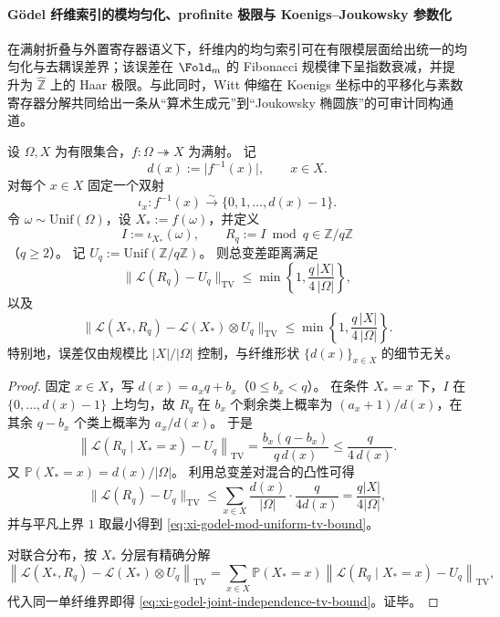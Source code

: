 \paragraph{Gödel 纤维索引的模均匀化、profinite 极限与 Koenigs--Joukowsky 参数化}
在满射折叠与外置寄存器语义下，纤维内的均匀索引可在有限模层面给出统一的均匀化与去耦误差界；该误差在 \(\Fold_m\) 的 Fibonacci 规模律下呈指数衰减，并提升为 \(\widehat{\mathbb Z}\) 上的 Haar 极限。与此同时，Witt 伸缩在 Koenigs 坐标中的平移化与素数寄存器分解共同给出一条从“算术生成元”到“Joukowsky 椭圆族”的可审计同构通道。

\begin{theorem}\label{thm:xi-godel-fiber-index-mod-uniformity-independence}
设 \(\Omega,X\) 为有限集合，\(f:\Omega\twoheadrightarrow X\) 为满射。
记
\[
d(x):=\bigl|f^{-1}(x)\bigr|,\qquad x\in X.
\]
对每个 \(x\in X\) 固定一个双射
\[
\iota_x:f^{-1}(x)\stackrel{\sim}{\longrightarrow}\{0,1,\dots,d(x)-1\}.
\]
令 \(\omega\sim\mathrm{Unif}(\Omega)\)，设 \(X_\ast:=f(\omega)\)，并定义
\[
I:=\iota_{X_\ast}(\omega),\qquad
R_q:=I\bmod q\in\mathbb Z/q\mathbb Z
\]
（\(q\ge 2\)）。
记 \(U_q:=\mathrm{Unif}(\mathbb Z/q\mathbb Z)\)。
则总变差距离满足
\begin{equation}\label{eq:xi-godel-mod-uniform-tv-bound}
\bigl\|\mathcal L(R_q)-U_q\bigr\|_{\mathrm{TV}}
\le
\min\!\left\{1,\frac{q\,|X|}{4\,|\Omega|}\right\},
\end{equation}
以及
\begin{equation}\label{eq:xi-godel-joint-independence-tv-bound}
\bigl\|\mathcal L(X_\ast,R_q)-\mathcal L(X_\ast)\otimes U_q\bigr\|_{\mathrm{TV}}
\le
\min\!\left\{1,\frac{q\,|X|}{4\,|\Omega|}\right\}.
\end{equation}
特别地，误差仅由规模比 \(|X|/|\Omega|\) 控制，与纤维形状 \(\{d(x)\}_{x\in X}\) 的细节无关。
\end{theorem}
\begin{proof}
固定 \(x\in X\)，写 \(d(x)=a_xq+b_x\)（\(0\le b_x<q\)）。
在条件 \(X_\ast=x\) 下，\(I\) 在 \(\{0,\dots,d(x)-1\}\) 上均匀，故
\(
R_q
\)
在 \(b_x\) 个剩余类上概率为 \((a_x+1)/d(x)\)，在其余 \(q-b_x\) 个类上概率为 \(a_x/d(x)\)。
于是
\[
\left\|\mathcal L(R_q\mid X_\ast=x)-U_q\right\|_{\mathrm{TV}}
=\frac{b_x(q-b_x)}{q\,d(x)}
\le \frac{q}{4\,d(x)}.
\]
又 \(\mathbb P(X_\ast=x)=d(x)/|\Omega|\)。
利用总变差对混合的凸性可得
\[
\|\mathcal L(R_q)-U_q\|_{\mathrm{TV}}
\le
\sum_{x\in X}\frac{d(x)}{|\Omega|}\cdot\frac{q}{4d(x)}
=\frac{q|X|}{4|\Omega|},
\]
并与平凡上界 \(1\) 取最小得到
\eqref{eq:xi-godel-mod-uniform-tv-bound}。

对联合分布，按 \(X_\ast\) 分层有精确分解
\[
\left\|\mathcal L(X_\ast,R_q)-\mathcal L(X_\ast)\otimes U_q\right\|_{\mathrm{TV}}
=
\sum_{x\in X}\mathbb P(X_\ast=x)
\left\|\mathcal L(R_q\mid X_\ast=x)-U_q\right\|_{\mathrm{TV}},
\]
代入同一单纤维界即得
\eqref{eq:xi-godel-joint-independence-tv-bound}。证毕。
\end{proof}


